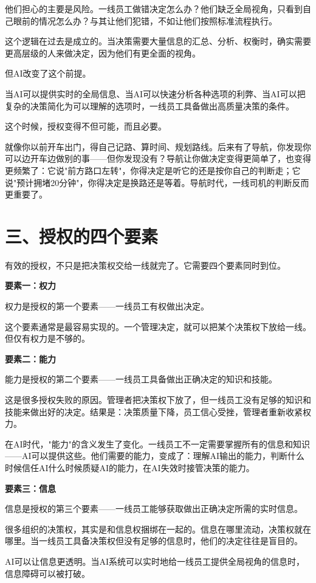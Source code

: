 他们担心的主要是风险。一线员工做错决定怎么办？他们缺乏全局视角，只看到自己眼前的情况怎么办？与其让他们犯错，不如让他们按照标准流程执行。

这个逻辑在过去是成立的。当决策需要大量信息的汇总、分析、权衡时，确实需要更高层级的人来做决定，因为他们有更全面的视角。

但AI改变了这个前提。

当AI可以提供实时的全局信息、当AI可以快速分析各种选项的利弊、当AI可以把复杂的决策简化为可以理解的选项时，一线员工具备做出高质量决策的条件。

这个时候，授权变得不但可能，而且必要。

就像你以前开车出门，得自己记路、算时间、规划路线。后来有了导航，你发现你可以边开车边做别的事——但你发现没有？导航让你做决定变得更简单了，也变得更频繁了：它说"前方路口左转"，你得决定是听它的还是按你自己的判断走；它说"预计拥堵20分钟"，你得决定是换路还是等着。导航时代，一线司机的判断反而更重要了。

\section{三、授权的四个要素}


有效的授权，不只是把决策权交给一线就完了。它需要四个要素同时到位。

\textbf{要素一：权力}

权力是授权的第一个要素——一线员工有权做出决定。

这个要素通常是最容易实现的。一个管理决定，就可以把某个决策权下放给一线。但仅有权力是不够的。

\textbf{要素二：能力}

能力是授权的第二个要素——一线员工具备做出正确决定的知识和技能。

这是很多授权失败的原因。管理者把决策权下放了，但一线员工没有足够的知识和技能来做出好的决定。结果是：决策质量下降，员工信心受挫，管理者重新收紧权力。

在AI时代，"能力"的含义发生了变化。一线员工不一定需要掌握所有的信息和知识——AI可以提供这些。他们需要的能力，变成了：理解AI输出的能力，判断什么时候信任AI什么时候质疑AI的能力，在AI失效时接管决策的能力。

\textbf{要素三：信息}

信息是授权的第三个要素——一线员工能够获取做出正确决定所需的实时信息。

很多组织的决策权，其实是和信息权捆绑在一起的。信息在哪里流动，决策权就在哪里。当一线员工具备决策权但没有足够的信息时，他们的决定往往是盲目的。

AI可以让信息更透明。当AI系统可以实时地给一线员工提供全局视角的信息时，信息障碍可以被打破。

